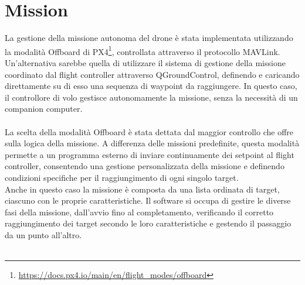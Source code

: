 \section{Mission}
La gestione della missione autonoma del drone è stata implementata utilizzando la modalità Offboard di PX4\footnote{\url{https://docs.px4.io/main/en/flight_modes/offboard}}, controllata attraverso il protocollo MAVLink. Un'alternativa sarebbe quella di utilizzare il sistema di gestione della missione coordinato dal flight controller attraverso QGroundControl, definendo e caricando direttamente su di esso una sequenza di waypoint da raggiungere. In questo caso, il controllore di volo gestisce autonomamente la missione, senza la necessità di un companion computer. \\ \\
La scelta della modalità Offboard è stata dettata dal maggior controllo che offre sulla logica della missione. A differenza delle missioni predefinite, questa modalità permette a un programma esterno di inviare continuamente dei setpoint al flight controller, consentendo una gestione personalizzata della missione e definendo condizioni specifiche per il raggiungimento di ogni singolo target. \\
Anche in questo caso la missione è composta da una lista ordinata di target, ciascuno con le proprie caratteristiche. Il software si occupa di gestire le diverse fasi della missione, dall'avvio fino al completamento, verificando il corretto raggiungimento dei target secondo le loro caratteristiche e gestendo il passaggio da un punto all'altro.\\ \\

